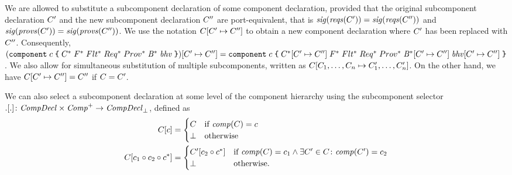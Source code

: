 \documentclass[a4paper,10pt,english]{article}
\begin{document}
We are allowed to substitute a subcomponent declaration of some component declaration, provided that the original subcomponent
declaration $C'$ and the new subcomponent declaration $C''$ are port-equivalent, that is
$\mathit{sig}(\mathit{reqs}(C')) = \mathit{sig}(\mathit{reqs}(C''))$ and $\mathit{sig}(\mathit{provs}(C')) =
\mathit{sig}(\mathit{provs}(C''))$.
We use the notation $C[C' \mapsto C'']$ to obtain a new component declaration where $C'$ has been
replaced with $C''$. Consequently,
$(\texttt{component} \; c \; \texttt{\{} \; C^* \; F^* \; Flt^* \; Req^* \; Prov^* \; \mathit{B}^* \; \mathit{bhv} \; \texttt{\}})[C'
\mapsto C''] = \texttt{component} \; c \; \texttt{\{} \; C^*[C' \mapsto
C''] \; F^* \; Flt^* \; Req^* \; Prov^* \; \mathit{B}^*[C'
\mapsto C''] \; \mathit{bhv}[C'\mapsto C''] \; \texttt{\}}$. We also allow for simultaneous substitution of multiple subcomponents, written
as $C[C_1, \ldots, C_n \mapsto C_1', \ldots, C_n']$. On the other hand, we have
$C[C' \mapsto C''] = C''$ if $C = C'$.

We can also select a subcomponent declaration at some level of the component hierarchy using the subcomponent selector $.[.]
\colon \mathit{CompDecl} \times \mathit{Comp}^+ \rightarrow \mathit{CompDecl}_\bot$, defined as
\begin{align*}
	C[c] &= \begin{cases}
		C & \text{if } \mathit{comp}(C) = c \\
		\bot & \text{otherwise}
	\end{cases} \\
	C[c_1 \circ c_2 \circ c^*] &= 
		\begin{cases}
			C'[c_2 \circ c^*] & \text{if } 
				\mathit{comp}(C) = c_1 \wedge \exists C' \in C \colon \mathit{comp}(C') = c_2 \\
			\bot & \text{otherwise.}
		\end{cases}
\end{align*}
\end{document}
